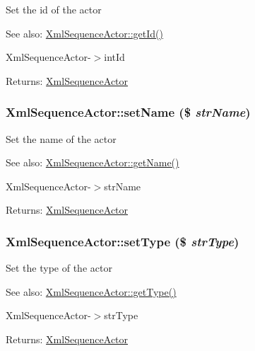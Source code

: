 Set the id of the actor

\begin{Desc}
\item[See also:]\hyperlink{class_xml_sequence_actor_47f896a3346344e6eae51239fa53e813}{XmlSequenceActor::getId()} 

XmlSequenceActor-$>$intId \end{Desc}
\begin{Desc}
\item[Returns:]\hyperlink{class_xml_sequence_actor}{XmlSequenceActor} \end{Desc}
\hypertarget{class_xml_sequence_actor_98d68b62f00bff3c2f72ce7da351f52c}{
\subsubsection[{setName}]{\setlength{\rightskip}{0pt plus 5cm}XmlSequenceActor::setName (\$ {\em strName})}}
\label{class_xml_sequence_actor_98d68b62f00bff3c2f72ce7da351f52c}


Set the name of the actor

\begin{Desc}
\item[See also:]\hyperlink{class_xml_sequence_actor_9a15dbaba511bef833d66240f927a04b}{XmlSequenceActor::getName()} 

XmlSequenceActor-$>$strName \end{Desc}
\begin{Desc}
\item[Returns:]\hyperlink{class_xml_sequence_actor}{XmlSequenceActor} \end{Desc}
\hypertarget{class_xml_sequence_actor_32eb3733e67e46091c032709d88e6088}{
\subsubsection[{setType}]{\setlength{\rightskip}{0pt plus 5cm}XmlSequenceActor::setType (\$ {\em strType})}}
\label{class_xml_sequence_actor_32eb3733e67e46091c032709d88e6088}


Set the type of the actor

\begin{Desc}
\item[See also:]\hyperlink{class_xml_sequence_actor_d0be22bbf0425675beabb6f3ea81a8e5}{XmlSequenceActor::getType()} 

XmlSequenceActor-$>$strType \end{Desc}
\begin{Desc}
\item[Returns:]\hyperlink{class_xml_sequence_actor}{XmlSequenceActor} \end{Desc}



